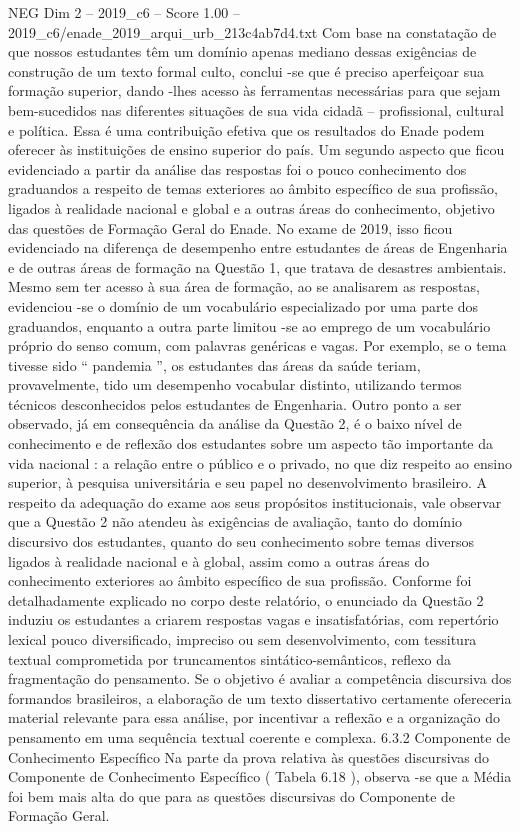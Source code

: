\begin{textsample}{NEG Dim 2 – 2019\_c6 – Score 1.00 – 2019\_c6/enade\_2019\_arqui\_urb\_213c4ab7d4.txt}
Com base na constatação de que nossos estudantes têm um domínio apenas mediano dessas exigências de construção de um texto formal culto, conclui -se que é preciso aperfeiçoar sua formação superior, dando -lhes acesso às ferramentas necessárias para que sejam bem-sucedidos nas diferentes situações de sua vida cidadã – profissional, cultural e política.
Essa é uma contribuição efetiva que os resultados do Enade podem oferecer às instituições de ensino superior do país.
Um segundo aspecto que ficou evidenciado a partir da análise das respostas foi o pouco conhecimento dos graduandos a respeito de temas exteriores ao âmbito específico de sua profissão, ligados à realidade nacional e global e a outras áreas do conhecimento, objetivo das questões de Formação Geral do Enade.
No exame de 2019, isso ficou evidenciado na diferença de desempenho entre estudantes de áreas de Engenharia e de outras áreas de formação na Questão 1, que tratava de desastres ambientais.
Mesmo sem ter acesso à sua área de formação, ao se analisarem as respostas, evidenciou -se o domínio de um vocabulário especializado por uma parte dos graduandos, enquanto a outra parte limitou -se ao emprego de um vocabulário próprio do senso comum, com palavras genéricas e vagas.
Por exemplo, se o tema tivesse sido “ pandemia ”, os estudantes das áreas da saúde teriam, provavelmente, tido um desempenho vocabular distinto, utilizando termos técnicos desconhecidos pelos estudantes de Engenharia.
Outro ponto a ser observado, já em consequência da análise da Questão 2, é o baixo nível de conhecimento e de reflexão dos estudantes sobre um aspecto tão importante da vida nacional : a relação entre o público e o privado, no que diz respeito ao ensino superior, à pesquisa universitária e seu papel no desenvolvimento brasileiro.
A respeito da adequação do exame aos seus propósitos institucionais, vale observar que a Questão 2 não atendeu às exigências de avaliação, tanto do domínio discursivo dos estudantes, quanto do seu conhecimento sobre temas diversos ligados à realidade nacional e à global, assim como a outras áreas do conhecimento exteriores ao âmbito específico de sua profissão.
Conforme foi detalhadamente explicado no corpo deste relatório, o enunciado da Questão 2 induziu os estudantes a criarem respostas vagas e insatisfatórias, com repertório lexical pouco diversificado, impreciso ou sem desenvolvimento, com tessitura textual comprometida por truncamentos sintático-semânticos, reflexo da fragmentação do pensamento.
Se o objetivo é avaliar a competência discursiva dos formandos brasileiros, a elaboração de um texto dissertativo certamente ofereceria material relevante para essa análise, por incentivar a reflexão e a organização do pensamento em uma sequência textual coerente e complexa. 6.3.2 Componente de Conhecimento Específico Na parte da prova relativa às questões discursivas do Componente de Conhecimento Específico ( Tabela 6.18 ), observa -se que a Média foi bem mais alta do que para as questões discursivas do Componente de Formação Geral.

\end{textsample}
